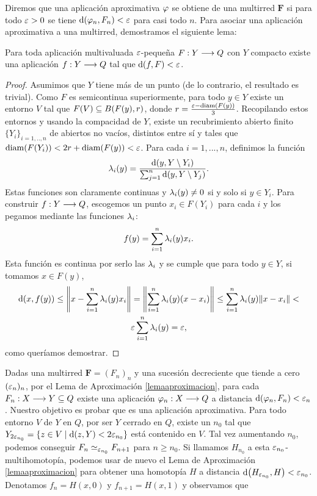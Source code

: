 Diremos que una aplicación aproximativa $ \varphi  $ se obtiene de una multirred $ \mathbf{F} $ si para todo $ \varepsilon>0  $ se tiene $ \dd(\varphi_n,F_n)<\varepsilon  $ para casi todo $ n $. Para asociar una aplicación aproximativa a una multirred, demostramos el siguiente lema:
\begin{lemma}[de Aproximación] \label{lemaaproximacion}
  Para toda aplicación multivaluada $ \varepsilon  $-peque\~na $ F:Y\longrightarrow Q  $ con $ Y  $ compacto existe una aplicación $ f:Y\longrightarrow Q  $ tal que $ \dd(f,F)<\varepsilon  $.
\end{lemma}
\begin{proof}
  Asumimos que $ Y  $ tiene más de un punto (de lo contrario, el resultado es trivial). Como $ F  $ es semicontinua superiormente, para todo $ y\in Y  $ existe un entorno $ V  $ tal que $ F(V)\subseteq B(F(y),r) $, donde $ r = \frac{\varepsilon-\operatorname{diam}(F(y))}{3} $. Recopilando estos entornos y usando la compacidad de $ Y  $, existe un recubrimiento abierto finito $ \{Y_i\}_{i=1,..,n} $ de abiertos no vacíos, distintos entre sí y tales que $ \operatorname{diam}(F(Y_i)) < 2r+\operatorname{diam}(F(y)) < \varepsilon  $. Para cada $ i=1,...,n  $, definimos la función 
  \begin{gather*}
    \lambda_i(y) = \frac{\dd(y,Y\setminus Y_i)}{\sum_{j=1}^{n}\dd(y,Y\setminus Y_j )}.
  \end{gather*}
  Estas funciones son claramente continuas y $ \lambda_i(y) \neq 0  $ si y solo si $ y\in Y_i  $. Para construir $ f:Y\longrightarrow Q  $, escogemos un punto $ x_i \in F(Y_i) $ para cada $ i  $ y los pegamos mediante las funciones $ \lambda_i$:
  \begin{gather*}
    f(y) = \sum_{i=1}^{n} \lambda_i(y)x_i .
  \end{gather*}
  Esta función es continua por serlo las $ \lambda_i  $ y se cumple que para todo $ y\in Y  $, si tomamos $ x\in F(y)  $, 
  \begin{gather*}
    \dd(x,f(y))\leq \norm{x-\sum_{i=1}^{n}\lambda_i(y) x_i}  = \norm{\sum_{i=1}^{n }\lambda_i(y) (x-x_i )}\leq \sum_{i=1}^{n } \lambda_i(y) \norm{x-x_i} < \\  \varepsilon \sum_{i=1 }^{n }\lambda_i(y)  = \varepsilon,
  \end{gather*}
  como queríamos demostrar. 
\end{proof}
Dadas una multirred $ \mathbf{F } = (F_n)_n$ y una sucesión decreciente que tiende a cero $ (\varepsilon_n)_n  $, por el Lema de Aproximación \ref{lemaaproximacion}, para cada $ F_n:X\longrightarrow Y \subseteq Q $ existe una aplicación $ \varphi_n:X\longrightarrow Q $ a distancia $ \dd(\varphi_n,F_n)<\varepsilon_n $. Nuestro objetivo es probar que es una aplicación aproximativa. Para todo entorno $ V  $ de $ Y  $ en $ Q  $, por ser $ Y  $ cerrado en $ Q  $, existe un $ n_0  $ tal que $ Y_{2\varepsilon_{n_0}} = \{z\in V\mid \dd(z,Y)<2\varepsilon_{n_0}\} $ está contenido en $ V  $. Tal vez aumentando $ n_0  $, podemos conseguir $ F_n \simeq_{\varepsilon_{n_0}} F_{n+1}$ para $ n\geq n_0 $. Si llamamos $ H_{n_0}  $ a esta $ \varepsilon_{n_0} $-multihomotopía, podemos usar de nuevo el Lema de Aproximación \ref{lemaaproximacion} para obtener una homotopía $ H  $ a distancia $ \dd(H_{\varepsilon_{n_0}},H)<\varepsilon_{n_0}  $. Denotamos $ f_n = H(x,0) $ y $ f_{n+1} = H(x,1) $ y observamos que
